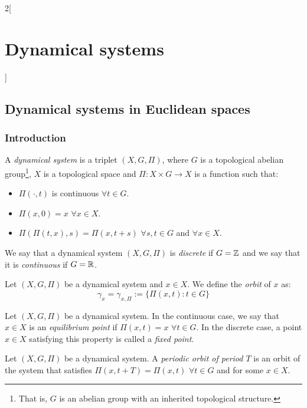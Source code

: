 \documentclass[../../../main.tex]{subfiles}
\begin{document}
\renewcommand{\col}{\apl}
\begin{multicols}{2}[\section{Dynamical systems}]
  \subsection{Dynamical systems in Euclidean spaces}
  \subsubsection{Introduction}
  \begin{definition}
    A \emph{dynamical system} is a triplet $(X,G,\Pi)$, where $G$ is a topological abelian group\footnote{That is, $G$ is an abelian group with an inherited topological structure.}, $X$ is a topological space and $\Pi:X\times G\rightarrow X$ is a function such that:
    \begin{itemize}
      \item $\Pi(\cdot,t)$ is continuous $\forall t\in G$.
      \item $\Pi(x,0)=x$ $\forall x\in X$.
      \item $\Pi(\Pi(t,x),s)=\Pi(x,t+s)$ $\forall s,t\in G$ and $\forall x\in X$.
    \end{itemize}
    We say that a dynamical system $(X,G,\Pi)$ is \emph{discrete} if $G=\mathbb{Z}$ and we say that it is \emph{continuous} if $G=\mathbb{R}$.
  \end{definition}
  \begin{definition}
    Let $(X,G,\Pi)$ be a dynamical system and $x\in X$. We define the \emph{orbit} of $x$ as: $$\gamma_x=\gamma_{x,\Pi}:=\{\Pi(x,t):t\in G\}$$
  \end{definition}
  \begin{definition}
    Let $(X,G,\Pi)$ be a dynamical system. In the continuous case, we say that $x\in X$ is an \emph{equilibrium point} if $\Pi(x,t)=x$ $\forall t\in G$. In the discrete case, a point $x\in X$ satisfying this property is called a \emph{fixed point}.
  \end{definition}
  \begin{definition}
    Let $(X,G,\Pi)$ be a dynamical system. A \emph{periodic orbit of period $T$} is an orbit of the system that satisfies $\Pi(x,t+T)=\Pi(x,t)$ $\forall t\in G$ and for some $x\in X$.
  \end{definition}
  \begin{lemma}

\end{lemma}
\end{multicols}
\end{document}

